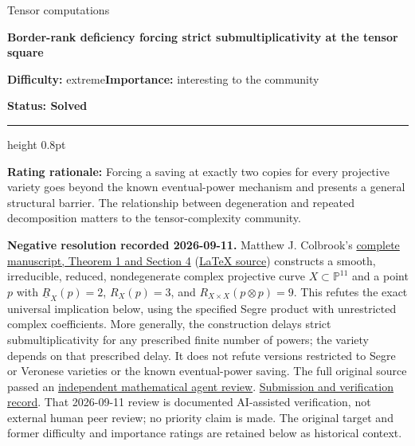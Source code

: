 \documentclass[11pt,a4paper]{article}
\begin{document}
{\sffamily\small\color{muted}Tensor computations\par}
\vspace{3pt}
{\raggedright{}\sffamily\bfseries\fontsize{21}{24}\selectfont\color{ink}Border-rank
deficiency forcing strict submultiplicativity at the tensor square\par}
\vspace{7pt}
{\sffamily\small\textbf{Difficulty:} extreme\quad\textbf{Importance:} interesting
to the community\par}
{\sffamily\small\bfseries\color{accent}Status: Solved\par}
\vspace{4pt}
{\color{accent}\hrule height 0.8pt}
\vspace{6pt}
\textbf{Rating rationale:} Forcing a saving at exactly two copies for
every projective variety goes beyond the known eventual-power mechanism
and presents a general structural barrier. The relationship between
degeneration and repeated decomposition matters to the tensor-complexity
community.

\textbf{Negative resolution recorded 2026-09-11.} Matthew J. Colbrook's
\href{https://github.com/ajt60gaibb/OpenProblemsInNLA/blob/main/references/colbrook-tensor-metrics-rank-2026-09-11/manuscripts/tr27_solution.pdf}{complete
manuscript, Theorem 1 and Section 4}
(\href{https://github.com/ajt60gaibb/OpenProblemsInNLA/blob/main/references/colbrook-tensor-metrics-rank-2026-09-11/manuscripts/tr27_solution.tex}{LaTeX
source}) constructs a smooth, irreducible, reduced, nondegenerate
complex projective curve \(X\subset\mathbb P^{11}\) and a point \(p\)
with \(\underline R_X(p)=2\), \(R_X(p)=3\), and
\(R_{X\times X}(p\otimes p)=9\). This refutes the exact universal
implication below, using the specified Segre product with unrestricted
complex coefficients. More generally, the construction delays strict
submultiplicativity for any prescribed finite number of powers; the
variety depends on that prescribed delay. It does not refute versions
restricted to Segre or Veronese varieties or the known eventual-power
saving. The full original source passed an
\href{https://github.com/ajt60gaibb/OpenProblemsInNLA/blob/main/references/colbrook-tensor-metrics-rank-2026-09-11/verification/reviews/TR-27-review.md}{independent
mathematical agent review}.
\href{https://github.com/ajt60gaibb/OpenProblemsInNLA/blob/main/references/colbrook-tensor-metrics-rank-2026-09-11/README.md}{Submission
and verification record}. That 2026-09-11 review is documented
AI-assisted verification, not external human peer review; no priority
claim is made. The original target and former difficulty and importance
ratings are retained below as historical context.
\end{document}
